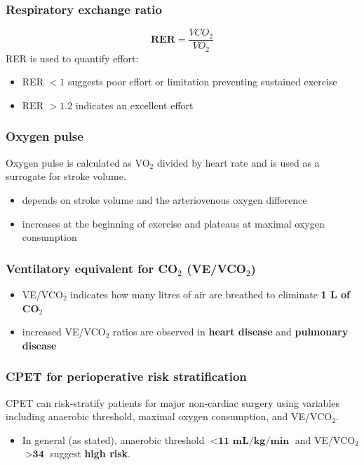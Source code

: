 \documentclass[11pt,a4paper]{article}
\begin{document}
\subsubsection{Respiratory exchange ratio}
\[
\textbf{RER} = \frac{VCO_2}{VO_2}
\]
RER is used to quantify effort:
\begin{itemize}
\item RER $<1$ suggests poor effort or limitation preventing sustained exercise
\item RER $>1.2$ indicates an excellent effort
\end{itemize}

\subsubsection{Oxygen pulse}
Oxygen pulse is calculated as VO$_2$ divided by heart rate and is used as a surrogate for stroke volume.
\begin{itemize}
\item depends on stroke volume and the arteriovenous oxygen difference
\item increases at the beginning of exercise and plateaus at maximal oxygen consumption
\end{itemize}

\subsubsection{Ventilatory equivalent for CO$_2$ (VE/VCO$_2$)}
\begin{itemize}
\item VE/VCO$_2$ indicates how many litres of air are breathed to eliminate \textbf{1 L of CO$_2$}
\item increased VE/VCO$_2$ ratios are observed in \textbf{heart disease} and \textbf{pulmonary disease}
\end{itemize}

\subsubsection{CPET for perioperative risk stratification}
CPET can risk-stratify patients for major non-cardiac surgery using variables including anaerobic threshold, maximal oxygen consumption, and VE/VCO$_2$.
\begin{itemize}
\item In general (as stated), anaerobic threshold $<\textbf{11 mL/kg/min}$ and VE/VCO$_2$ $>\textbf{34}$ suggest \textbf{high risk}.
\end{itemize}
\end{document}
